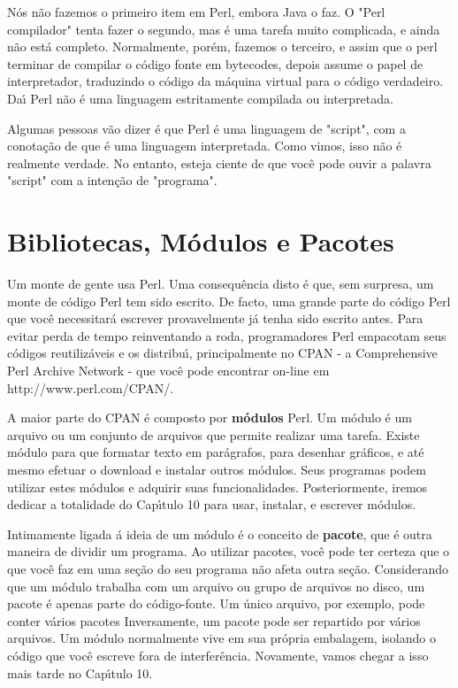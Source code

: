 \documentclass[a4paper,11pt]{book}
\begin{document}
\noindent N\'os n\~ao fazemos o primeiro item em Perl, embora Java o faz. O "Perl compilador" tenta fazer o segundo, mas \'e uma tarefa muito complicada, e ainda n\~ao est\'a completo. Normalmente, por\'em, fazemos o terceiro, e assim que o perl terminar de compilar o c\'odigo fonte em bytecodes, depois assume o papel de interpretador, traduzindo o c\'odigo da m\'aquina virtual para o c\'odigo verdadeiro. Da\'{\i} Perl n\~ao \'e uma linguagem  estritamente compilada ou interpretada.

\noindent 

\noindent Algumas pessoas v\~ao dizer \'e que Perl \'e uma linguagem de "script", com a conota\c{c}\~ao de que \'e uma linguagem interpretada. Como vimos, isso n\~ao \'e realmente verdade. No entanto, esteja ciente de que voc\^e pode ouvir a palavra "script" com a inten\c{c}\~ao de "programa".

\section{Bibliotecas, M\'odulos e Pacotes}

\noindent Um monte de gente usa Perl. Uma consequ\^encia disto \'e que, sem surpresa, um monte de c\'odigo Perl tem sido escrito. De facto, uma grande parte do c\'odigo Perl que voc\^e necessitar\'a escrever provavelmente j\'a tenha sido escrito antes. Para evitar perda de tempo reinventando a roda, programadores Perl empacotam seus c\'odigos reutiliz\'aveis e os distribu\'{\i}, principalmente no CPAN - a Comprehensive Perl Archive Network - que voc\^e pode encontrar on-line em http://www.perl.com/CPAN/.

\noindent 

A maior parte do CPAN \'e composto por \textbf{m\'odulos} Perl. Um m\'odulo \'e um arquivo ou um conjunto de arquivos que permite realizar uma tarefa. Existe m\'odulo para que formatar texto em par\'agrafos, para desenhar gr\'aficos, e at\'e mesmo efetuar o download e instalar outros m\'odulos. Seus programas podem utilizar estes m\'odulos e adquirir suas funcionalidades. Posteriormente, iremos dedicar a totalidade do Cap\'{\i}tulo 10 para usar, instalar, e escrever m\'odulos.

\noindent 

\noindent Intimamente ligada \'a ideia de um m\'odulo \'e o conceito de \textbf{pacote}, que \'e outra maneira de dividir um programa. Ao utilizar pacotes, voc\^e pode ter certeza que o que voc\^e faz em uma se\c{c}\~ao do seu programa n\~ao afeta outra se\c{c}\~ao. Considerando que um m\'odulo trabalha com um arquivo ou grupo de arquivos no disco, um pacote \'e apenas parte do c\'odigo-fonte. Um \'unico arquivo, por exemplo, pode conter v\'arios pacotes Inversamente, um pacote pode ser repartido por v\'arios arquivos. Um m\'odulo normalmente vive em sua pr\'opria embalagem, isolando o c\'odigo que voc\^e escreve fora de interfer\^encia. Novamente, vamos chegar a isso mais tarde no Cap\'{\i}tulo 10.
\end{document}

